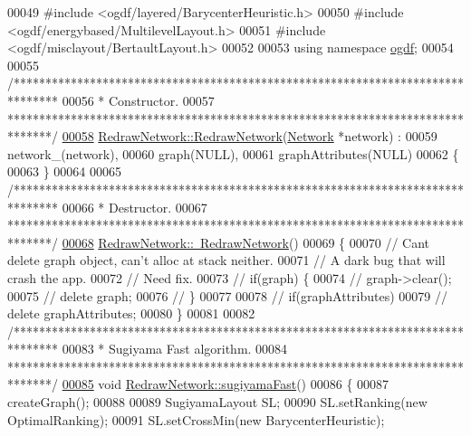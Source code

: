 \begin{DoxyCode}
00049 \textcolor{preprocessor}{#include <ogdf/layered/BarycenterHeuristic.h>}
00050 \textcolor{preprocessor}{#include <ogdf/energybased/MultilevelLayout.h>}
00051 \textcolor{preprocessor}{#include <ogdf/misclayout/BertaultLayout.h>}
00052 
00053 \textcolor{keyword}{using namespace }\hyperlink{namespaceogdf}{ogdf};
00054 
00055 \textcolor{comment}{/*******************************************************************************}
00056 \textcolor{comment}{* Constructor.}
00057 \textcolor{comment}{*******************************************************************************/}
\hypertarget{redrawnetwork_8cpp_source_l00058}{}\hyperlink{group___algorithms_ga1fe3edb8c57780eb62f7de8f03dfeda3}{00058} \hyperlink{group___algorithms_ga1fe3edb8c57780eb62f7de8f03dfeda3}{RedrawNetwork::RedrawNetwork}(\hyperlink{class_network}{Network} *network) :
00059   network\_(network),
00060   graph(NULL),
00061   graphAttributes(NULL)
00062 \{
00063 \}
00064 
00065 \textcolor{comment}{/*******************************************************************************}
00066 \textcolor{comment}{* Destructor.}
00067 \textcolor{comment}{*******************************************************************************/}
\hypertarget{redrawnetwork_8cpp_source_l00068}{}\hyperlink{group___algorithms_gac7b5f7fdb2b88e7d8bb580834e93b1e8}{00068} \hyperlink{group___algorithms_gac7b5f7fdb2b88e7d8bb580834e93b1e8}{RedrawNetwork::~RedrawNetwork}()
00069 \{
00070 \textcolor{comment}{// Cant delete graph object, can't alloc at stack neither.}
00071 \textcolor{comment}{// A dark bug that will crash the app.}
00072 \textcolor{comment}{// Need fix.}
00073 \textcolor{comment}{//  if(graph) \{}
00074 \textcolor{comment}{//    graph->clear();}
00075 \textcolor{comment}{//    delete graph;}
00076 \textcolor{comment}{//  \}}
00077 
00078 \textcolor{comment}{//  if(graphAttributes)}
00079 \textcolor{comment}{//    delete graphAttributes;}
00080 \}
00081 
00082 \textcolor{comment}{/*******************************************************************************}
00083 \textcolor{comment}{* Sugiyama Fast algorithm.}
00084 \textcolor{comment}{*******************************************************************************/}
\hypertarget{redrawnetwork_8cpp_source_l00085}{}\hyperlink{group___algorithms_ga94d53ddf8ee00c4ef6d56bb988333103}{00085} \textcolor{keywordtype}{void} \hyperlink{group___algorithms_ga94d53ddf8ee00c4ef6d56bb988333103}{RedrawNetwork::sugiyamaFast}()
00086 \{
00087   createGraph();
00088 
00089   SugiyamaLayout SL;
00090   SL.setRanking(\textcolor{keyword}{new} OptimalRanking);
00091   SL.setCrossMin(\textcolor{keyword}{new} BarycenterHeuristic);

\end{DoxyCode}
